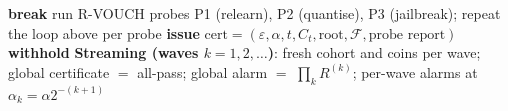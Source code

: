 \documentclass[pdflatex,sn-mathphys-num]{sn-jnl}
\theoremstyle{thmstyleone}
\theoremstyle{thmstyletwo}
\theoremstyle{thmstylethree}
\newcommand{\F}{\mathcal{F}}
\newcommand{\eps}{\varepsilon}
\providecommand{\DIFaddend}{} %
\DeclareRobustCommand{\DIFaddend}{\DIFOaddend \let\includegraphics\DIFOincludegraphics} %
\begin{document}
\begin{algorithm}[t]
\begin{algorithmic}[1]
  \EndIf
     \State \textbf{break} 
  \EndIf
\EndFor
\State run R-VOUCH probes P1 (relearn), P2 (quantise), P3 (jailbreak); repeat the
       loop above per probe
   \State \textbf{issue} $\mathrm{cert} = (\eps, \alpha, t, C_t, \mathrm{root},
          \F, \text{probe report})$
\Else
   \State \textbf{withhold} 
\EndIf
\Statex \textbf{Streaming (waves $k = 1, 2, \dots$)}: fresh cohort and coins per wave;
        global certificate $=$ all-pass; global alarm $=$ $\prod_k R^{(k)}$; per-wave
        alarms at $\alpha_k = \alpha 2^{-(k+1)}$ 
\end{algorithmic}
\DIFaddend \end{algorithm}
\end{document}
